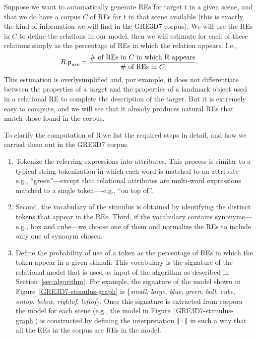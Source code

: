 Suppose we want to automatically generate REs for target $t$ in a given scene, and that we do have a corpus $C$ of REs for $t$ in that scene available (this is exactly the kind of information we will find in the GRE3D7 corpus).  We will use the REs in $C$ to define the relations 
in our model, then we will estimate \puse for each of these relations simply as the percentage of REs in which the relation appears.  I.e., 
$$
R.\textsf{p}_\textit{use} = \frac{\# \mbox{ of REs in $C$ in which R appears}}{\# \mbox{ of REs in $C$}}.
$$
This estimation is overlysimplified and, por example, it does not differentiate between the properties of a target and the properties of a landmark object used in a relational RE to complete the description of the target.  But it is extremely easy to compute, and we will see that 
it already produces natural REs that match those found in the corpus. 

To clarify the computation of R.\puse we list the required steps in detail, and how we carried them out in the GRE3D7 corpus.

\begin{enumerate}
\item Tokenize the referring expressions into attributes. This process is similar to a typical string tokenization in which each word is matched to an attribute---e.g., ``green''---except that relational attributes are multi-word expressions matched to a single token----e.g., ``on top of''. 
\item Second, the vocabulary of the stimulus is obtained by identifying the distinct tokens that appear in the REs. Third, if the vocabulary contains synonyms---e.g., box and cube---we choose one of them and normalize the REs to include only one of synonym chosen. 

\item Define the probability of use of a token as the percentage of REs in which the token appear in a given stimuli. This vocabulary is the signature of the relational model that is used as input of the algorithm as described in Section~\ref{sec:algorithm}. For example, the signature of the model shown in Figure~\ref{GRE3D7-stimulus-graph} is \{\emph{small}, \emph{large}, \emph{blue}, \emph{green}, \emph{ball}, \emph{cube}, \emph{ontop}, \emph{below}, \emph{rightof}, \emph{leftof}\}. Once this signature is extracted from corpora the model for each scene (e.g., the model in Figure~\ref{GRE3D7-stimulus-graph}) is constructed by defining the interpretation $|\!|\cdot|\!|$ in such a way that all the REs in the corpus are REs in the model. 
\end{enumerate}

